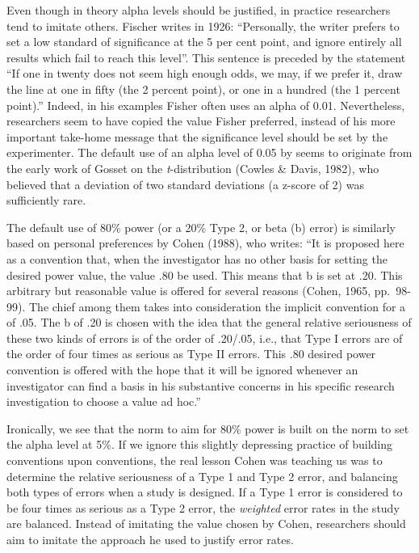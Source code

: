 \documentclass[,jou,floatsintext]{apa6}
\begin{document}
Even though in theory alpha levels should be justified, in practice researchers tend to imitate others. Fischer writes in 1926: \enquote{Personally, the writer prefers to set a low standard of significance at the 5 per cent point, and ignore entirely all results which fail to reach this level}. This sentence is preceded by the statement \enquote{If one in twenty does not seem high enough odds, we may, if we prefer it, draw the line at one in fifty (the 2 percent point), or one in a hundred (the 1 percent point).} Indeed, in his examples Fisher often uses an alpha of 0.01. Nevertheless, researchers seem to have copied the value Fisher preferred, instead of his more important take-home message that the significance level should be set by the experimenter. The default use of an alpha level of 0.05 by seems to originate from the early work of Gosset on the \emph{t}-distribution (Cowles \& Davis, 1982), who believed that a deviation of two standard deviations (a z-score of 2) was sufficiently rare.

The default use of 80\% power (or a 20\% Type 2, or beta (b) error) is similarly based on personal preferences by Cohen (1988), who writes: \enquote{It is proposed here as a convention that, when the investigator has no other basis for setting the desired power value, the value .80 be used. This means that b is set at .20. This arbitrary but reasonable value is offered for several reasons (Cohen, 1965, pp.~98-99). The chief among them takes into consideration the implicit convention for a of .05. The b of .20 is chosen with the idea that the general relative seriousness of these two kinds of errors is of the order of .20/.05, i.e., that Type I errors are of the order of four times as serious as Type II errors. This .80 desired power convention is offered with the hope that it will be ignored whenever an investigator can find a basis in his substantive concerns in his specific research investigation to choose a value ad hoc.}

Ironically, we see that the norm to aim for 80\% power is built on the norm to set the alpha level at 5\%. If we ignore this slightly depressing practice of building conventions upon conventions, the real lesson Cohen was teaching us was to determine the relative seriousness of a Type 1 and Type 2 error, and balancing both types of errors when a study is designed. If a Type 1 error is considered to be four times as serious as a Type 2 error, the \emph{weighted} error rates in the study are balanced. Instead of imitating the value chosen by Cohen, researchers should aim to imitate the approach he used to justify error rates.
\end{document}
